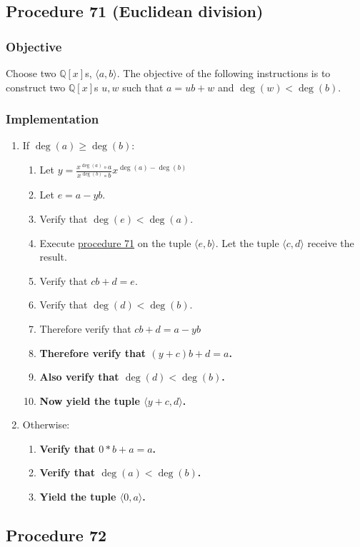 \documentclass[twocolumn]{article}
\begin{document}
		\subsection{Procedure 71 (Euclidean division)}\label{sec:procedure 71}
			\subsubsection{Objective}
				Choose two $\mathbb{Q}[x]$s, $\langle a,b\rangle$. The objective of the following instructions is to construct two $\mathbb{Q}[x]$s $u,w$ such that $a=ub+w$ and $\deg(w)<\deg(b)$.
			\subsubsection{Implementation}
				\begin{enumerate}
					\item If $\deg(a)\ge\deg(b)$:
					\begin{enumerate}
						\item Let $y=\frac{x^{\deg(a)}\circ a}{x^{\deg(b)}\circ b}x^{\deg(a)-\deg(b)}$
						\item Let $e=a-yb$.
						\item Verify that $\deg(e)<\deg(a)$.
						\item Execute \hyperref[sec:procedure 71]{procedure 71} on the tuple $\langle e,b\rangle$. Let the tuple $\langle c,d\rangle$ receive the result.
						\item Verify that $cb+d=e$.
						\item Verify that $\deg(d)<\deg(b)$.
						\item Therefore verify that $cb+d=a-yb$
						\item \textbf{Therefore verify that $(y+c)b+d=a$.}
						\item \textbf{Also verify that $\deg(d)<\deg(b)$.}
						\item \textbf{Now yield the tuple $\langle y+c, d\rangle$.}
					\end{enumerate}
					\item Otherwise:
					\begin{enumerate}
						\item \textbf{Verify that $0*b+a=a$.}
						\item \textbf{Verify that $\deg(a)<\deg(b)$.}
						\item \textbf{Yield the tuple $\langle 0,a\rangle$.}
					\end{enumerate}
				\end{enumerate}
		\subsection{Procedure 72}\label{sec:procedure 72}
\end{document}
